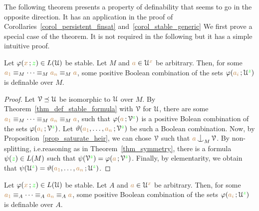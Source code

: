 The following theorem presents a property of definability that seems to go in the opposite direction.
It has an application in the proof of Corollaries~\ref{corol_persistent_finsat} and~\ref{corol_stable_generic}
We first prove a special case of the theorem.
It is not required in the following but it has a simple intuitive proof.

\begin{proposition}
  Let $\varphi({\color{brown} x}\,;{\color{green} z})\in L(\EuScript U)$ be stable.
  Let $M$ and ${\color{brown} a}\in\EuScript U^{\color{brown} x}$ be arbitrary.
  Then, for some ${\color{brown} a_1}\equiv_M\dots\equiv_M{\color{brown} a_n}\equiv_M{\color{brown} a}$, some positive Boolean combination of the sets $\varphi({\color{brown} a_i}\,;\EuScript U^{\color{green} z})$ is definable over $M$.
\end{proposition}

\begin{proof}
  Let $\EuScript V\preceq\EuScript U$ be isomorphic to $\EuScript U$ over $M$.
  By Theorem~\ref{thm_def_stable_formula} with $\EuScript V$ for $\EuScript U$, there are  some ${\color{brown} a_1}\equiv_M\dots\equiv_M{\color{brown} a_n}\equiv_M{\color{brown} a}$, such that $\varphi({\color{brown} a}\,;\EuScript V^{\color{green} z})$ is a positive Bolean combination of the sets $\varphi({\color{brown} a_i}\,;\EuScript V^{\color{green} z})$.
  Let $\vartheta({\color{brown} a_1},\dots,{\color{brown} a_n}\,;\EuScript V^{\color{green} z})$ be such a Boolean combination.
  Now, by Proposition~\ref{prop_saturate_heir}, we can chose $\EuScript V$ such that ${\mr a}\nonfork_M\V$.
  By non-splitting, i.e.\@ reasoning as in Theorem~\ref{thm_symmetry}, there is a formula $\psi({\color{green} z})\in L(M)$ such that $\psi(\EuScript V^{\color{green} z})=\varphi({\color{brown} a}\,;\EuScript V^{\color{green} z})$.
  Finally, by elementarity, we obtain that $\psi(\EuScript U^{\color{green} z})=\vartheta({\color{brown} a_1},\dots,{\color{brown} a_n}\,;\EuScript U^{\color{green} z})$.
\end{proof}

\begin{theorem}\label{thm_stability_definable_rovescio}
  Let $\varphi({\color{brown} x}\,;{\color{green} z})\in L(\EuScript U)$ be stable.
  Let $A$ and ${\color{brown} a}\in\EuScript U^{\color{brown} x}$ be arbitrary.
  Then, for some ${\color{brown} a_1}\equiv_A\dots\equiv_A{\color{brown} a_n}\equiv_A{\color{brown} a}$, some positive Boolean combination of the sets $\varphi({\color{brown} a_i}\,;\EuScript U^{\color{green} z})$ is definable over $A$.
\end{theorem}

